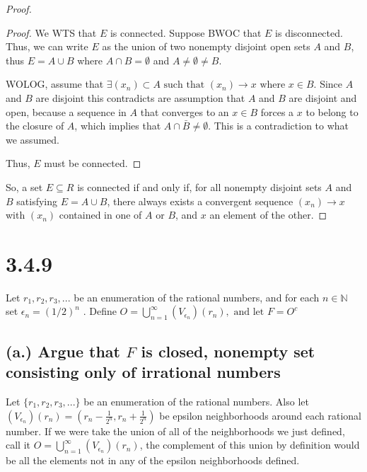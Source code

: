\documentclass{article}
\begin{document}
\begin{proof}
\begin{enumerate}
\begin{proof}
We WTS that $E$ is connected. Suppose BWOC that $E$ is disconnected. Thus, we can write $E$ as the 
union of two nonempty disjoint open sets $A$ and $B$, thus $E = A \cup B$ where $A \cap B = \emptyset$ 
and $A \ne \emptyset \ne B$.

WOLOG, assume that $\exists (x_n) \subset A \text{ such that } (x_n) \rightarrow x \text{ where } x \in B$. Since 
$A$ and $B$ are disjoint this contradicts are assumption that $A$ and $B$ are disjoint and open, because a sequence in $A$ 
that converges to an $x \in B$ forces a $x$ to belong to the closure of $A$, which implies that $A \cap \bar{B} \ne \emptyset$. 
This is a contradiction to what we assumed. 

Thus, $E$ must be connected.

\end{proof}
\end{enumerate}

  So, a set $E \subseteq R$ is connected if and only if, for all nonempty
  disjoint sets $A$ and $B$ satisfying $E = A \cup B$, there 
  always exists a convergent sequence $(x_n) \rightarrow x$ with 
  $(x_n)$ contained in one of $A$ or $B$, and $x$ an element of the other.
   

\end{proof}


\section*{3.4.9}
Let ${r_1, r_2, r_3, ...}$ be an enumeration of the rational 
numbers, and for each $n \in \mathbb{N}$ set $\epsilon_n =(1/2)^n$ . 
Define $O = \bigcup_{n=1}^{\infty} (V_{\epsilon_n}) (r_n), \text{ and let } F=O^c$



\subsection*{(a.) Argue that $F$ is closed, nonempty set consisting only of
 irrational numbers}

Let $\{r_1, r_2, r_3, ...\}$ be an enumeration of the rational numbers. Also let 
$(V_{\epsilon_n}) (r_n) = (r_n - \frac{1}{2^n}, r_n + \frac{1}{2^n})$ be epsilon 
neighborhoods around each rational number. If we were take the union of all of 
the neighborhoods we just defined, call it $O = \bigcup_{n=1}^{\infty} (V_{\epsilon_n}) (r_n)$, 
the complement of this union by definition would be all the elements not in any of the 
epsilon neighborhoods defined. 
\end{document}
